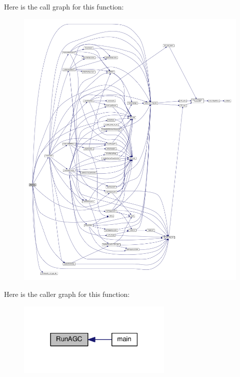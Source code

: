 Here is the call graph for this function\+:
\nopagebreak
\begin{figure}[H]
\begin{center}
\leavevmode
\includegraphics[width=350pt]{d8/d4c/lms7002m__agc_8c_adce4a8efb4d0eb17b578b99489f4ef77_cgraph}
\end{center}
\end{figure}




Here is the caller graph for this function\+:
\nopagebreak
\begin{figure}[H]
\begin{center}
\leavevmode
\includegraphics[width=210pt]{d8/d4c/lms7002m__agc_8c_adce4a8efb4d0eb17b578b99489f4ef77_icgraph}
\end{center}
\end{figure}


